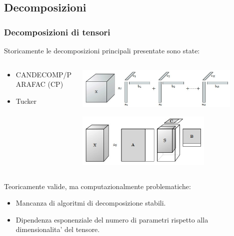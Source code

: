 \documentclass{beamer}
\theoremstyle{definition}
\theoremstyle{plain}
\begin{document}
\subsection{Decomposizioni}
\begin{frame}
\frametitle{Decomposizioni di tensori}
Storicamente le decomposizioni principali presentate sono state: 

\vspace{5mm}
\begin{columns}
\begin{column}{0.6\textwidth}
\begin{itemize}
\item CANDECOMP/PARAFAC (CP) %
	\vspace{3mm}
\item Tucker
\end{itemize}
\end{column}
\begin{column}{0.4\textwidth}
\includegraphics[width=0.85\textwidth]{Img/cp.jpg}

\includegraphics[width=0.7\textwidth]{Img/tucker.jpg}
\end{column}
\end{columns}

\vspace{5mm}
Teoricamente valide, ma computazionalmente problematiche:
\begin{itemize}
	\item Mancanza di algoritmi di decomposizione stabili.
	\item Dipendenza esponenziale del numero di parametri rispetto alla dimensionalita' del tensore.
\end{itemize}
\end{frame}
\end{document}
